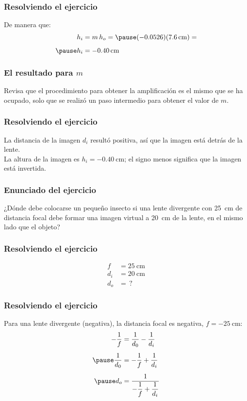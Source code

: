 \documentclass[14pt]{beamer}
\begin{document}
\begin{frame}
\frametitle{Resolviendo el ejercicio}
De manera que:
\pause
\begin{eqnarray*}
\begin{aligned}
h_{i} &= m \, h_{o} = \pause (-0.0526)(\SI{7.6}{\centi\meter}) = \\[0.5em] \pause
h_{i} &= - \SI{0.40}{\centi\meter}
\end{aligned}
\end{eqnarray*}
\end{frame}
\begin{frame}
\frametitle{El resultado para $m$}
Revisa que el procedimiento para obtener la amplificación es el mismo que se ha ocupado, solo que se realizó un paso intermedio para obtener el valor de $m$.
\end{frame}
\begin{frame}
\frametitle{Resolviendo el ejercicio}
La distancia de la imagen $d_{i}$ resultó positiva, \pause así que la imagen está detrás de la lente.
\\
\bigskip
\pause
La altura de la imagen es $h_{i} = - \SI{0.40}{\centi\meter}$; \pause el signo menos significa que la imagen está invertida.
\end{frame}
\begin{frame}
\frametitle{Enunciado del ejercicio}
¿Dónde debe colocarse un pequeño insecto si una lente divergente con \SI{25}{\centi\meter} de distancia focal debe formar una imagen virtual a \SI{20}{\centi\meter} de la lente, en el mismo lado que el objeto?
\end{frame}
\begin{frame}
\frametitle{Resolviendo el ejercicio}
\vspace*{-1.5cm}
\pause
\begin{align*}
f &= \SI{25}{\centi\meter}\\
d_{i} &= \SI{20}{\centi\meter} \\
d_{o} &= \, ?
\end{align*}
\end{frame}
\begin{frame}
\frametitle{Resolviendo el ejercicio}
\vspace*{-1.5cm}
Para una lente divergente (negativa), la distancia focal es negativa, \pause $f = - \SI{25}{\centi\meter}$:
\\
\pause
\begin{eqnarray*}
\begin{aligned}
- \dfrac{1}{f} &= \dfrac{1}{d_{0}} - \dfrac{1}{d_{i}} \\[0.5em] \pause
\dfrac{1}{d_{0}} &= - \dfrac{1}{f} + \dfrac{1}{d_{i}} \\[0.5em] \pause
d_{o} &= \dfrac{1}{- \dfrac{1}{f} + \dfrac{1}{d_{i}}}     
\end{aligned}
\end{eqnarray*}
\end{frame}
\end{document}
